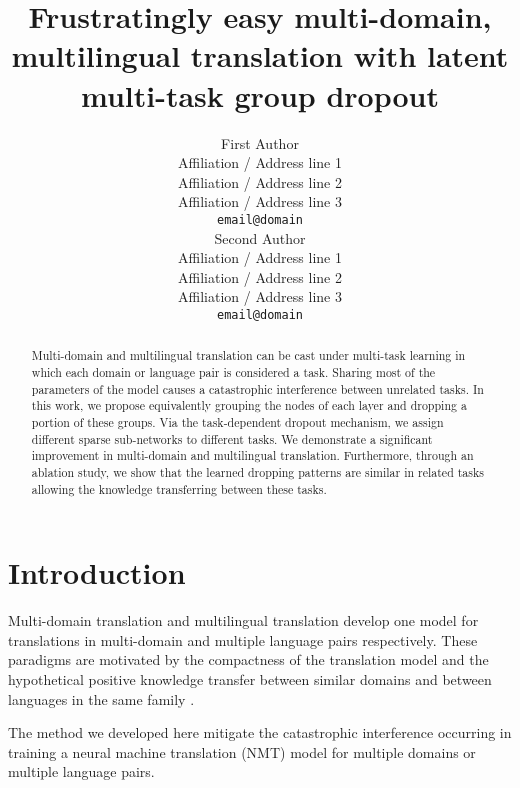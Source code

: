 \documentclass[11pt]{article}
\title{Frustratingly easy multi-domain, multilingual translation with latent multi-task group dropout}
\author{First Author \\
  Affiliation / Address line 1 \\
  Affiliation / Address line 2 \\
  Affiliation / Address line 3 \\
  \texttt{email@domain} \\\And
  Second Author \\
  Affiliation / Address line 1 \\
  Affiliation / Address line 2 \\
  Affiliation / Address line 3 \\
  \texttt{email@domain} \\}
\begin{document}
\maketitle
\begin{abstract}
Multi-domain and multilingual translation can be cast under multi-task learning in which each domain or language pair is considered a task. Sharing most of the parameters of the model causes a catastrophic interference between unrelated tasks. In this work, we propose equivalently grouping the nodes of each layer and dropping a portion of these groups. Via the task-dependent dropout mechanism, we assign different sparse sub-networks to different tasks. We demonstrate a significant improvement in multi-domain and multilingual translation. Furthermore, through an ablation study, we show that the learned dropping patterns are similar in related tasks allowing the knowledge transferring between these tasks.

\end{abstract}

\section{Introduction}
Multi-domain translation and multilingual translation develop one model for translations in multi-domain and multiple language pairs respectively. These paradigms are motivated by the compactness of the translation model and the hypothetical positive knowledge transfer between similar domains \citep{Pham21revisiting} and between languages in the same family \citep{Tan19multilingual}. 

\citet{Christopher21efficiently}

The method we developed here mitigate the catastrophic interference occurring in training a neural machine translation (NMT) model for multiple domains or multiple language pairs.
\end{document}
